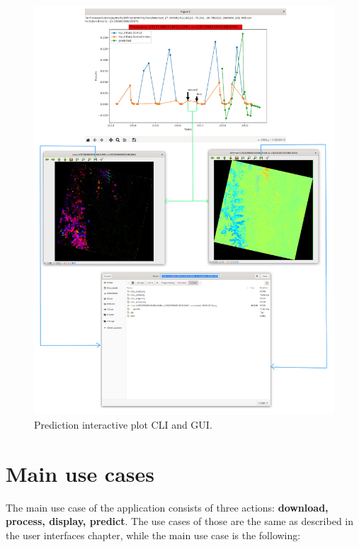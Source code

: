 \documentclass[12pt, a4paper]{report}
\begin{document}
	\begin{figure}[H]
		\centering
		\includegraphics[scale=1.5]{DISPLAY_plot.png}
		\caption{Prediction interactive plot CLI and GUI.}
		\label{fig:prediction_gui}
	\end{figure}

	\section{Main use cases}
	
	The main use case of the application consists of three actions: \textbf{download, process, display, predict}. The use cases of those are the same as described in the user interfaces chapter, while the main use case is the following:
	
\end{document}
